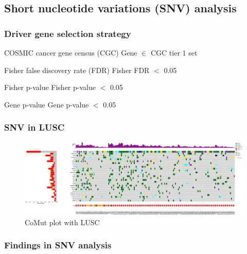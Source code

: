 \documentclass{beamer}
\begin{document}
        \subsection{Short nucleotide variations (SNV) analysis}
            \begin{frame}
                \frametitle{Driver gene selection strategy}

                \begin{block}{COSMIC cancer gene census (CGC) \cite{CGC-01}}
                    Gene $\in$ CGC tier 1 set
                \end{block}

                \begin{block}{Fisher false discovery rate (FDR)}
                    Fisher FDR $<$ 0.05
                \end{block}

                \begin{block}{Fisher p-value}
                    Fisher p-value $<$ 0.05
                \end{block}

                \begin{block}{Gene p-value}
                    Gene p-value $<$ 0.05
                \end{block}
            \end{frame}

            \begin{frame}
                \frametitle{SNV in LUSC}

                \begin{figure}
                    \includegraphics[width=0.9 \linewidth]{figures/Mutect2/BWA-SQC.pdf}
                    \caption{CoMut plot with LUSC}
                \end{figure}
            \end{frame}

            \begin{frame}
                \frametitle{Findings in SNV analysis}
            \end{frame}
\end{document}
